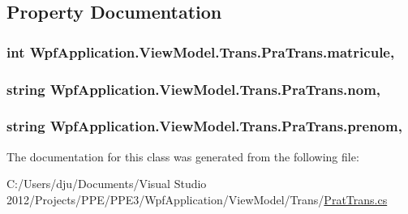 \subsection{Property Documentation}
\hypertarget{class_wpf_application_1_1_view_model_1_1_trans_1_1_pra_trans_a2789e23bae9ee1f522226f69231ad5c3}{
\subsubsection[{matricule}]{\setlength{\rightskip}{0pt plus 5cm}int Wpf\-Application.\-View\-Model.\-Trans.\-Pra\-Trans.\-matricule\hspace{0.3cm}{\ttfamily [get]}, {\ttfamily [set]}}}\label{class_wpf_application_1_1_view_model_1_1_trans_1_1_pra_trans_a2789e23bae9ee1f522226f69231ad5c3}
\hypertarget{class_wpf_application_1_1_view_model_1_1_trans_1_1_pra_trans_a7440714237eda3b50d17c0c86f110527}{
\subsubsection[{nom}]{\setlength{\rightskip}{0pt plus 5cm}string Wpf\-Application.\-View\-Model.\-Trans.\-Pra\-Trans.\-nom\hspace{0.3cm}{\ttfamily [get]}, {\ttfamily [set]}}}\label{class_wpf_application_1_1_view_model_1_1_trans_1_1_pra_trans_a7440714237eda3b50d17c0c86f110527}
\hypertarget{class_wpf_application_1_1_view_model_1_1_trans_1_1_pra_trans_aa0a1dc27ff028a606acbeaf3c00967e8}{
\subsubsection[{prenom}]{\setlength{\rightskip}{0pt plus 5cm}string Wpf\-Application.\-View\-Model.\-Trans.\-Pra\-Trans.\-prenom\hspace{0.3cm}{\ttfamily [get]}, {\ttfamily [set]}}}\label{class_wpf_application_1_1_view_model_1_1_trans_1_1_pra_trans_aa0a1dc27ff028a606acbeaf3c00967e8}


The documentation for this class was generated from the following file\-:\begin{DoxyCompactItemize}
\item 
C\-:/\-Users/dju/\-Documents/\-Visual Studio 2012/\-Projects/\-P\-P\-E/\-P\-P\-E3/\-Wpf\-Application/\-View\-Model/\-Trans/\hyperlink{_prat_trans_8cs}{Prat\-Trans.\-cs}\end{DoxyCompactItemize}
